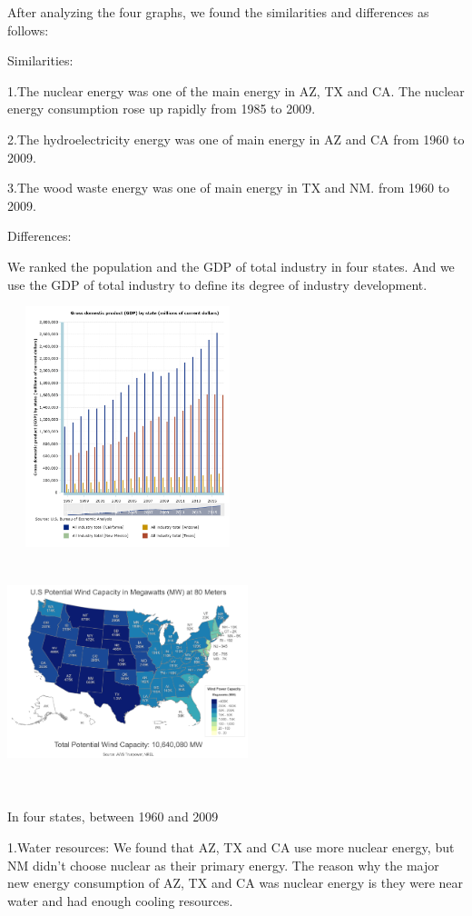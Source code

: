 \documentclass[12pt]{article}
\begin{document}
After analyzing the four graphs, we found the similarities and differences as follows:

Similarities:

1.The nuclear energy was one of the main energy in AZ, TX and CA. The nuclear energy consumption rose up rapidly from 1985 to 2009.

2.The hydroelectricity energy was one of main energy in AZ and CA from 1960 to 2009.

3.The wood waste energy was one of main energy in TX and NM. from 1960 to 2009.

Differences:

We ranked the population and the GDP of total industry in four states. And we use the GDP of total industry to define its degree of industry development.

\includegraphics[width=7cm,height=7cm]{b13.jpg}
\includegraphics[width=7cm,height=7cm]{b12.png}

In four states, between 1960 and 2009

1.Water resources:
We found that AZ, TX and CA use more nuclear energy, but NM didn't choose nuclear as their primary energy.
 The reason why the major new energy consumption of AZ, TX and CA was nuclear energy is they were near water and had enough cooling resources.
\end{document}
